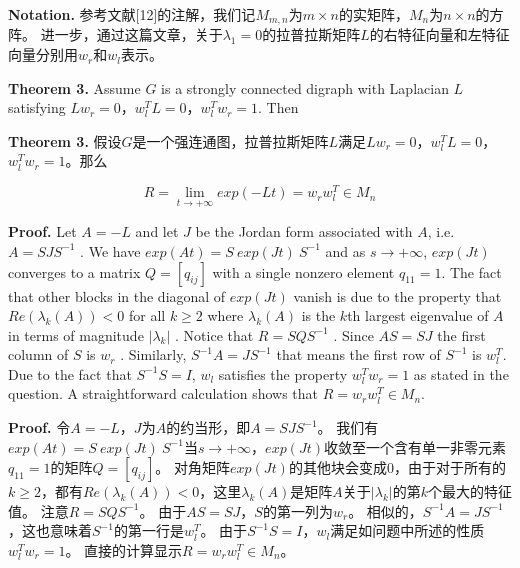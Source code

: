 \documentclass{article}
\begin{document}
\noindent \textbf{Notation.} 参考文献[12]的注解，我们记$M_{m,n}$为$m\times n$的实矩阵，$M_n$为$n \times n$的方阵。
进一步，通过这篇文章，关于$\lambda_1 = 0$的拉普拉斯矩阵$L$的右特征向量和左特征向量分别用$w_r$和$w_l$表示。

{\color[gray]{0.5}
\noindent \textbf{Theorem 3.} Assume $G$ is a strongly connected digraph with Laplacian $L$ satisfying $Lw_r=0$，$w_l^TL = 0$，$w_l^Tw_r=1$. Then
}

\noindent \textbf{Theorem 3.} 假设$G$是一个强连通图，拉普拉斯矩阵$L$满足$Lw_r=0$，$w_l^TL = 0$，$w_l^Tw_r=1$。那么

\begin{equation}
    R = \lim_{t\rightarrow +\infty} exp(-Lt) = w_r w_l^T \in M_n
    \tag{18}
    \label{18}
\end{equation}


{\color[gray]{0.5}
\noindent \textbf{Proof.} Let $A=-L$ and let $J$ be the Jordan form associated with $A$, i.e. $A=SJS^{-1}$ . 
We have $exp(At) = S\ exp(Jt)\ S^{-1}$ and as $s\rightarrow +\infty$, $exp(Jt)$ converges to a matrix $Q=[q_{ij}]$ with a single nonzero element $q_{11}=1$. 
The fact that other blocks in the diagonal of $exp(Jt)$ vanish is due to the property that $Re(\lambda_k(A))<0$ for all $k\ge2$ where $\lambda_k(A)$ is the $k$th largest eigenvalue of $A$ in terms of magnitude $|\lambda_k|$ . 
Notice that $R=SQS^{-1}$ . 
Since $AS=SJ$ the ﬁrst column of $S$ is $w_r$ . 
Similarly, $S^{-1}A = JS^{-1}$ that means the ﬁrst row of $S^{-1}$ is $w_l^T$. 
Due to the fact that $S^{-1}S=I$, $w_l$ satisﬁes the property $w_l^Tw_r=1$ as stated in the question. 
A straightforward calculation shows that $R=w_rw_l^T\in M_n$.
}

\noindent \textbf{Proof.} 令$A=-L$，$J$为$A$的约当形，即$A=SJS^{-1}$。
我们有$exp(At) = S\ exp(Jt)\ S^{-1}$当$s\rightarrow +\infty$，$exp(Jt)$收敛至一个含有单一非零元素$q_{11}=1$的矩阵$Q=[q_{ij}]$。
对角矩阵$exp(Jt)$的其他块会变成0，由于对于所有的$k\ge2$，都有$Re(\lambda_k(A))<0$，这里$\lambda_k(A)$是矩阵$A$关于$|\lambda_k|$的第$k$个最大的特征值。
注意$R=SQS^{-1}$。
由于$AS=SJ$，$S$的第一列为$w_r$。
相似的，$S^{-1}A = JS^{-1}$，这也意味着$S^{-1}$的第一行是$w_l^T$。
由于$S^{-1}S=I$，$w_l$满足如问题中所述的性质$w_l^Tw_r=1$。
直接的计算显示$R=w_rw_l^T\in M_n$。
\end{document}

